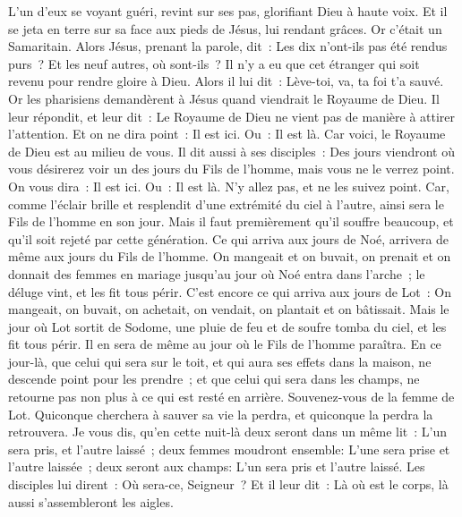 \begin{multicols}{2}
L'un d'eux se voyant guéri, revint sur ses pas, glorifiant Dieu à haute voix.
Et il se jeta en terre sur sa face aux pieds de Jésus, lui rendant grâces. Or c'était un Samaritain.
Alors Jésus, prenant la parole, dit~: Les dix n'ont-ils pas été rendus purs~? Et les neuf autres, où sont-ils~?
Il n'y a eu que cet étranger qui soit revenu pour rendre gloire à Dieu.
Alors il lui dit~: Lève-toi, va, ta foi t'a sauvé.
Or les pharisiens demandèrent à Jésus quand viendrait le Royaume de Dieu. Il leur répondit, et leur dit~: Le Royaume de Dieu ne vient pas de manière à attirer l'attention.
Et on ne dira point~: Il est ici. Ou~: Il est là. Car voici, le Royaume de Dieu est au milieu de vous.
Il dit aussi à ses disciples~: Des jours viendront où vous désirerez voir un des jours du Fils de l'homme, mais vous ne le verrez point. On vous dira~:
Il est ici. Ou~: Il est là. N'y allez pas, et ne les suivez point.
Car, comme l'éclair brille et resplendit d'une extrémité du ciel à l'autre, ainsi sera le Fils de l'homme en son jour.
Mais il faut premièrement qu'il souffre beaucoup, et qu'il soit rejeté par cette génération.
Ce qui arriva aux jours de Noé, arrivera de même aux jours du Fils de l'homme.
On mangeait et on buvait, on prenait et on donnait des femmes en mariage jusqu'au jour où Noé entra dans l'arche~; le déluge vint, et les fit tous périr.
C'est encore ce qui arriva aux jours de Lot~: On mangeait, on buvait, on achetait, on vendait, on plantait et on bâtissait.
Mais le jour où Lot sortit de Sodome, une pluie de feu et de soufre tomba du ciel, et les fit tous périr.
Il en sera de même au jour où le Fils de l'homme paraîtra.
En ce jour-là, que celui qui sera sur le toit, et qui aura ses effets dans la maison, ne descende point pour les prendre~; et que celui qui sera dans les champs, ne retourne pas non plus à ce qui est resté en arrière.
Souvenez-vous de la femme de Lot.
Quiconque cherchera à sauver sa vie la perdra, et quiconque la perdra la retrouvera.
Je vous dis, qu'en cette nuit-là deux seront dans un même lit~: L'un sera pris, et l'autre laissé~;
deux femmes moudront ensemble: L'une sera prise et l'autre laissée~;
deux seront aux champs: L'un sera pris et l'autre laissé.
Les disciples lui dirent~: Où sera-ce, Seigneur~? Et il leur dit~: Là où est le corps, là aussi s'assembleront les aigles.

\end{multicols}
